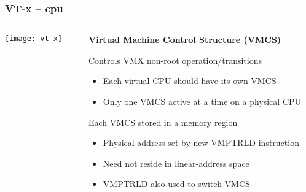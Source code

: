 \begin{frame}[plain]
	\frametitle{VT-x -- cpu}
	
	
	
	\begin{columns}
		
		\begin{column}{.5\textwidth}
			
			\texttt{[image: vt-x]}
			
		\end{column}
		
		\begin{column}{.5\textwidth}
			
			\textbf{Virtual Machine Control Structure (VMCS)}
			
			Controls VMX non-root operation/transitions
			\begin{itemize}
				\item Each virtual CPU should have its own VMCS
				\item Only one VMCS active at a time on a physical CPU
				
			\end{itemize} 
			
			Each VMCS stored in a memory region
			
			\begin{itemize}
				\item Physical address set by new VMPTRLD instruction
				\item Need not reside in linear-address space 
				\item VMPTRLD also used to switch VMCS
				
				
			\end{itemize}
			
		\end{column}
		
		
	\end{columns}
	
	
\end{frame}

